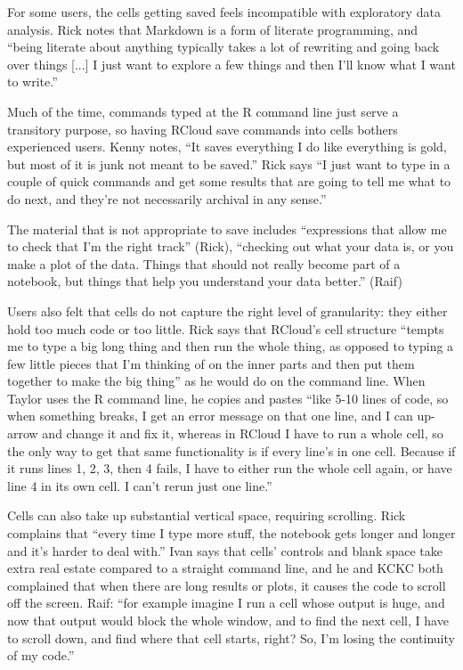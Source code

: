 For some users, the cells getting saved feels incompatible with exploratory data
analysis. Rick notes that Markdown is a form of literate programming, and
``being literate about anything typically takes a lot of rewriting and going
back over things [...] I just want to explore a few things and then I'll know
what I want to write.''

Much of the time, commands typed at the R command line just serve a transitory
purpose, so having RCloud save commands into cells bothers experienced
users. Kenny notes, ``It saves everything I do like everything is gold, but most
of it is junk not meant to be saved.'' Rick says ``I just want to type in a
couple of quick commands and get some results that are going to tell
me what to do next, and they're not necessarily archival in any sense.''

The material that is not appropriate to save includes ``expressions that allow
me to check that I'm the right track'' (Rick), ``checking out what your data is,
or you make a plot of the data. Things that should not really become part of a
notebook, but things that help you understand your data better.'' (Raif)

Users also felt that cells do not capture the right level of granularity: they
either hold too much code or too little. Rick says that RCloud's cell structure
``tempts me to type a big long thing and then run the whole thing, as opposed to
typing a few little pieces that I'm thinking of on the inner parts and then put
them together to make the big thing'' as he would do on the command line. When
Taylor uses the R command line, he copies and pastes ``like 5-10 lines of code,
so when something breaks, I get an error message on that one line, and I can
up-arrow and change it and fix it, whereas in RCloud I have to run a whole cell,
so the only way to get that same functionality is if every line's in one
cell. Because if it runs lines 1, 2, 3, then 4 fails, I have to either run the
whole cell again, or have line 4 in its own cell. I can't rerun just one line.''

Cells can also take up substantial vertical space, requiring scrolling. Rick
complains that ``every time I type more stuff, the notebook gets longer and
longer and it's harder to deal with.'' Ivan says that cells' controls and blank
space take extra real estate compared to a straight command line, and he and
KCKC both complained that when there are long results or plots, it causes the
code to scroll off the screen. Raif: ``for example imagine I run a cell whose
output is huge, and now that output would block the whole window, and to
find the next cell, I have to scroll down, and find where that cell starts,
right? So, I'm losing the continuity of my code.''

